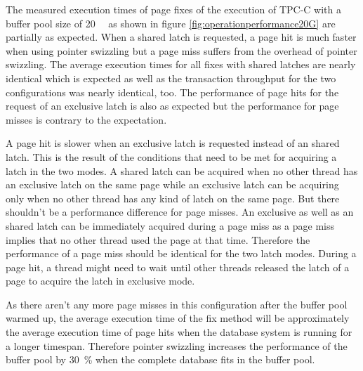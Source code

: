 	The measured execution times of page fixes of the execution of TPC-C with a buffer pool size of \SI{20}{\gibi\byte} as shown in figure \ref{fig:operationperformance20G} are partially as expected. When a shared latch is requested, a page hit is much faster when using pointer swizzling but a page miss suffers from the overhead of pointer swizzling. The average execution times for all fixes with shared latches are nearly identical which is expected as well as the transaction throughput for the two configurations was nearly identical, too. The performance of page hits for the request of an exclusive latch is also as expected but the performance for page misses is contrary to the expectation.
	
	A page hit is slower when an exclusive latch is requested instead of an shared latch. This is the result of the conditions that need to be met for acquiring a latch in the two modes. A shared latch can be acquired when no other thread has an exclusive latch on the same page while an exclusive latch can be acquiring only when no other thread has any kind of latch on the same page. But there shouldn't be a performance difference for page misses. An exclusive as well as an shared latch can be immediately acquired during a page miss as a page miss implies that no other thread used the page at that time. Therefore the performance of a page miss should be identical for the two latch modes. During a page hit, a thread might need to wait until other threads released the latch of a page to acquire the latch in exclusive mode.
	
	As there aren't any more page misses in this configuration after the buffer pool warmed up, the average execution time of the fix method will be approximately the average execution time of page hits when the database system is running for a longer timespan. Therefore pointer swizzling increases the performance of the buffer pool by \SI{30}{\percent} when the complete database fits in the buffer pool.

